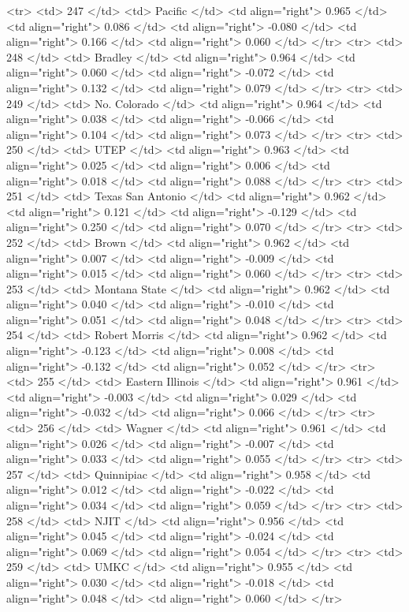   <tr> <td> 247 </td> <td> Pacific </td> <td align="right"> 0.965 </td> <td align="right"> 0.086 </td> <td align="right"> -0.080 </td> <td align="right"> 0.166 </td> <td align="right"> 0.060 </td> </tr>
  <tr> <td> 248 </td> <td> Bradley </td> <td align="right"> 0.964 </td> <td align="right"> 0.060 </td> <td align="right"> -0.072 </td> <td align="right"> 0.132 </td> <td align="right"> 0.079 </td> </tr>
  <tr> <td> 249 </td> <td> No. Colorado </td> <td align="right"> 0.964 </td> <td align="right"> 0.038 </td> <td align="right"> -0.066 </td> <td align="right"> 0.104 </td> <td align="right"> 0.073 </td> </tr>
  <tr> <td> 250 </td> <td> UTEP </td> <td align="right"> 0.963 </td> <td align="right"> 0.025 </td> <td align="right"> 0.006 </td> <td align="right"> 0.018 </td> <td align="right"> 0.088 </td> </tr>
  <tr> <td> 251 </td> <td> Texas San Antonio </td> <td align="right"> 0.962 </td> <td align="right"> 0.121 </td> <td align="right"> -0.129 </td> <td align="right"> 0.250 </td> <td align="right"> 0.070 </td> </tr>
  <tr> <td> 252 </td> <td> Brown </td> <td align="right"> 0.962 </td> <td align="right"> 0.007 </td> <td align="right"> -0.009 </td> <td align="right"> 0.015 </td> <td align="right"> 0.060 </td> </tr>
  <tr> <td> 253 </td> <td> Montana State </td> <td align="right"> 0.962 </td> <td align="right"> 0.040 </td> <td align="right"> -0.010 </td> <td align="right"> 0.051 </td> <td align="right"> 0.048 </td> </tr>
  <tr> <td> 254 </td> <td> Robert Morris </td> <td align="right"> 0.962 </td> <td align="right"> -0.123 </td> <td align="right"> 0.008 </td> <td align="right"> -0.132 </td> <td align="right"> 0.052 </td> </tr>
  <tr> <td> 255 </td> <td> Eastern Illinois </td> <td align="right"> 0.961 </td> <td align="right"> -0.003 </td> <td align="right"> 0.029 </td> <td align="right"> -0.032 </td> <td align="right"> 0.066 </td> </tr>
  <tr> <td> 256 </td> <td> Wagner </td> <td align="right"> 0.961 </td> <td align="right"> 0.026 </td> <td align="right"> -0.007 </td> <td align="right"> 0.033 </td> <td align="right"> 0.055 </td> </tr>
  <tr> <td> 257 </td> <td> Quinnipiac </td> <td align="right"> 0.958 </td> <td align="right"> 0.012 </td> <td align="right"> -0.022 </td> <td align="right"> 0.034 </td> <td align="right"> 0.059 </td> </tr>
  <tr> <td> 258 </td> <td> NJIT </td> <td align="right"> 0.956 </td> <td align="right"> 0.045 </td> <td align="right"> -0.024 </td> <td align="right"> 0.069 </td> <td align="right"> 0.054 </td> </tr>
  <tr> <td> 259 </td> <td> UMKC </td> <td align="right"> 0.955 </td> <td align="right"> 0.030 </td> <td align="right"> -0.018 </td> <td align="right"> 0.048 </td> <td align="right"> 0.060 </td> </tr>
